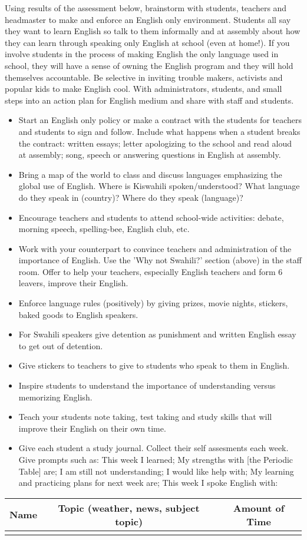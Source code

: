 Using results of the assessment below, brainstorm with students, teachers
and headmaster to make and enforce an English only environment. Students
all say they want to learn English so talk to them informally and
at assembly about how they can learn through speaking only English
at school (even at home!). If you involve students in the process
of making English the only language used in school, they will have
a sense of owning the English program and they will hold themselves
accountable. Be selective in inviting trouble makers, activists and
popular kids to make English cool. With administrators, students,
and small steps into an action plan for English medium and share with
staff and students.
\begin{itemize}
\item Start an English only policy or make a contract with the students
for teachers and students to sign and follow. Include what happens
when a student breaks the contract: written essays; letter apologizing
to the school and read aloud at assembly; song, speech or answering
questions in English at assembly.
\item Bring a map of the world to class and discuss languages emphasizing
the global use of English. Where is Kiswahili spoken/understood? What
language do they speak in (country)? Where do they speak (language)? 
\item Encourage teachers and students to attend school-wide activities:
debate, morning speech, spelling-bee, English club, etc.
\item Work with your counterpart to convince teachers and administration
of the importance of English. Use the 'Why not Swahili?' section (above)
in the staff room. Offer to help your teachers, especially English
teachers and form 6 leavers, improve their English.
\item Enforce language rules (positively) by giving prizes, movie nights,
stickers, baked goods to English speakers.
\item For Swahili speakers give detention as punishment and written English
essay to get out of detention. 
\item Give stickers to teachers to give to students who speak to them in
English. 
\item Inspire students to understand the importance of understanding versus
memorizing English. 
\item Teach your students note taking, test taking and study skills that
will improve their English on their own time.
\item Give each student a study journal. Collect their self assesments each
week. Give prompts such as: This week I learned; My strengths with
{[}the Periodic Table{]} are; I am still not understanding; I would
like help with; My learning and practicing plans for next week are;
This week I spoke English with:
\end{itemize}
\begin{tabular}{|c|c|c|}
\hline 
Name & Topic (weather, news, subject topic) & Amount of Time\tabularnewline
\hline 
\hline 
 &  & \tabularnewline
\hline 
\end{tabular}



